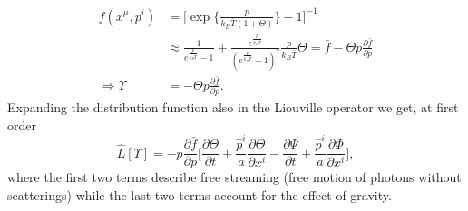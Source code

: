 \begin{align*}
    f(x^\mu,p^i) &= \bigg[\exp\bigg\{\frac{p}{k_B\bar T(1+\Theta)}\bigg\}-1\bigg]^{-1}\\&\approx\frac{1}{e^{\frac{p}{k_B\bar T}}-1}+\frac{e^{\frac{p}{k_B\bar T}}}{(e^{\frac{p}{k_B\bar T}}-1)^2}\frac{p}{k_B \bar T}\Theta=\bar f-\Theta p \frac{\partial\bar f}{\partial p}\\
    \Longrightarrow \Upsilon &= -\Theta p \frac{\partial\bar f}{\partial p}.
\end{align*}
Expanding the distribution function also in the Liouville operator we get, at first order
\begin{equation}\label{eq:liouville_pert}
    \hat L[\Upsilon] = -p\frac{\partial\bar f}{\partial p}\bigg[\frac{\partial \Theta}{\partial t}+\frac{\hat p^i}{a}\frac{\partial \Theta}{\partial x^i}-\frac{\partial\Psi}{\partial t}+\frac{\hat p^i}{a}\frac{\partial \Phi}{\partial x^i}\bigg],
\end{equation}
where the first two terms describe free streaming (free motion of photons without scatterings) while the last two terms account for the effect of gravity. 

